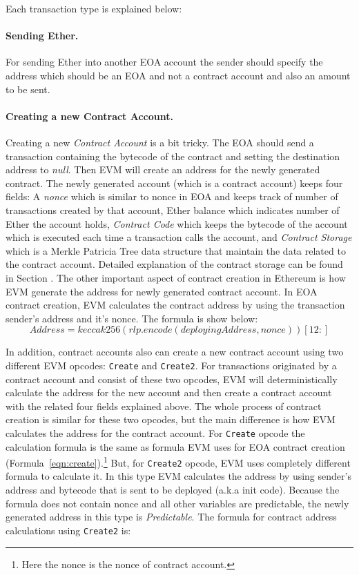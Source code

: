 Each transaction type is explained below:

\paragraph{Sending Ether.} 
For sending Ether into another EOA account the sender should specify the address which should be an EOA and not a contract account and also an amount to be sent.

\paragraph{Creating a new Contract Account.}
Creating a new \textit{Contract Account} is a bit tricky. The EOA should send a transaction containing the bytecode of the contract and setting the destination address to \emph{null}. Then EVM will create an address for the newly generated contract. The newly generated account (which is a contract account) keeps four fields: A \textit{nonce} which is similar to nonce in EOA and keeps track of number of transactions created by that account, Ether balance which indicates number of Ether the account holds, \textit{Contract Code} which keeps the bytecode of the account which is executed each time a transaction calls the account, and \textit{Contract Storage} which is a Merkle Patricia Tree data structure that maintain the data related to the contract account. Detailed explanation of the contract storage can be found in Section . 
The other important aspect of contract creation in Ethereum is how EVM generate the address for newly generated contract account. In EOA contract creation, EVM calculates the contract address by using the transaction sender's address and it's nonce. The formula is show below:
\begin{equation}
    \label{eqn:create}
    Address = keccak256(rlp.encode(deployingAddress, nonce))[12:]
\end{equation}

In addition, contract accounts also can create a new contract account using two different EVM opcodes: \texttt{Create} and \texttt{Create2}. For transactions originated by a contract account and consist of these two opcodes, EVM will deterministically calculate the address for the new account and then create a contract account with the related four fields explained above. The whole process of contract creation is similar for these two opcodes, but the main difference is how EVM calculates the address for the contract account. For \texttt{Create} opcode the calculation formula is the same as formula EVM uses for EOA contract creation (Formula~\ref{eqn:create}).\footnote{Here the nonce is the nonce of contract account.} But, for \texttt{Create2} opcode, EVM uses completely different formula to calculate it. In this type EVM calculates the address by using sender's address and bytecode that is sent to be deployed (a.k.a init code). Because the formula does not contain nonce and all other variables are predictable, the newly generated address in this type is \emph{Predictable}. The formula for contract address calculations using \texttt{Create2} is:

